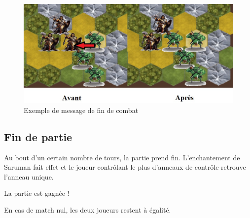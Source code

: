 \begin{figure}[ht!]
\centering
\includegraphics[scale=0.50]{img/fincombat.jpg}
\caption{Exemple de message de fin de combat}
\end{figure}

\newpage
\subsection{Fin de partie}

Au bout d'un certain nombre de tours, la partie prend fin. 
\newline
L'enchantement de Saruman fait effet et le joueur contrôlant le plus d'anneaux de contrôle retrouve l'anneau unique. 
\newline
\begin{center}
La partie est gagnée !
\end{center}
\begin{center}
En cas de match nul, les deux joueurs restent à égalité.
\end{center}